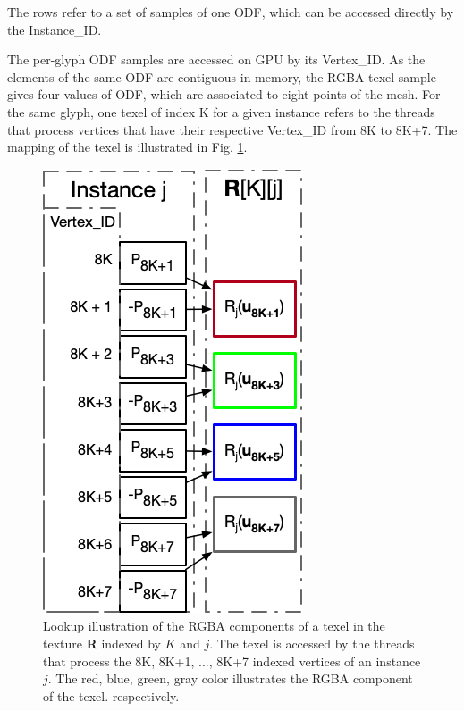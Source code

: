\documentclass[twoside,twocolumn,10pt]{article}
\begin{document}
The rows refer to a set of samples of one ODF, which can be accessed directly by the Instance\_ID.

The per-glyph ODF samples are accessed on GPU by its Vertex\_ID. As the elements of the same ODF are contiguous in memory, the RGBA texel sample gives four values of ODF, which are associated to eight points of the mesh. For the same glyph, one texel of index K for a given instance refers to the threads that process vertices that have their respective Vertex\_ID from 8K to 8K+7. The mapping of the texel is illustrated in Fig. \ref{fig::texelfetch}.

\begin{figure}[ht]
    \centering
    \includegraphics[width=0.7\linewidth, angle=0]{figs/rendering_scheme/texellookup.png}
    \caption{Lookup illustration of the RGBA components of a texel in the texture \textbf{R} indexed by $K$ and $j$. The texel is accessed by the threads that process the 8K, 8K+1, ..., 8K+7 indexed vertices of an instance $j$. The red, blue, green, gray color illustrates the RGBA component of the texel. respectively.}
    \label{fig::texelfetch}
\end{figure}
\end{document}
